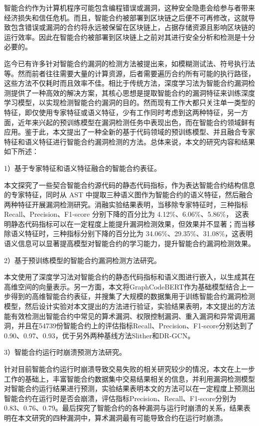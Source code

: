 \cleardoublepage
{}
智能合约作为计算机程序可能包含编程错误或漏洞，这种安全隐患会给参与者带来经济损失和信任危机。而且，智能合约被部署到区块链之后便不可再修改，这就导致包含错误或漏洞的合约将永远被保留在区块链上，占据存储资源且影响区块链的运行效率。因此在智能合约被部署到区块链上之前对其进行安全分析和检测是十分必要的。

迄今已有许多针对智能合约漏洞的检测方法被提出来，如模糊测试法、符号执行法等。然而前者往往需要大量的计算资源，后者需要遍历合约所有可能的执行路径，这些方法不仅耗时而且效率不佳。相比于传统方法，深度学习法为智能合约漏洞检测提供了一种高效的解决方案，其核心思想是提取智能合约的漏洞特征来训练深度学习模型，以实现检测智能合约漏洞的目的。然而现有工作大都只关注单一类型的特征，即仅使用专家特征或语义特征，少有工作同时考虑到这两种特征，另一方面，近年来兴起的预训练模型在漏洞检测任务中表现出色，而在智能合约领域鲜有应用。鉴于此，本文提出了一种全新的基于代码领域的预训练模型、并且融合专家特征和语义特征进行智能合约漏洞检测的方法。总体来说，本文的研究内容和结果如下所述：

    1）基于专家特征和语义特征融合的智能合约表征。

    本文探究了一些契合智能合约源代码的静态代码指标，作为表达智能合约结构信息的专家特征，同时从 AST 中提取三种语义图作为智能合约的语义特征，然后融合两种特征开展漏洞检测研究。消融实验结果表明，当移除专家特征时，三种指标 Recall、Precision、F1-score 分别下降的百分比为 4.12\%、6.06\%、5.86\%， 这表明静态代码指标可以在一定程度上能提升漏洞检测效果，但效果并不显著；而当移除语义特征时，三种指标分别下降的百分比为 34.06\%、29.35\%、31.08\%，这表明语义信息可以显著提高模型对智能合约的学习能力，提升智能合约漏洞检测效果。

    2）基于预训练模型的智能合约漏洞检测方法研究。
    
    本文使用了深度学习法对智能合约的静态代码指标和语义图进行嵌入，以生成其在高维空间的向量表示。另一方面，本文将GraphCodeBERT作为基础模型结合上一步得到的高维智能合约表征，并搜集了大规模的数据集用于训练智能合约漏洞检测模型，然后设计实验对本文提出的方法进行验证，实验结果表明，本文提出的方法能有效检测出智能合约中常见的算术漏洞、权限控制漏洞、重入漏洞和异常调用漏洞，并且在\num{54739}份智能合约上的评估指标Recall、Precision、F1-score分别达到了0.90、0.97、0.93，优于另外两种基线方法Slither和DR-GCN。
    
    3）智能合约运行时崩溃预测方法研究。
    
    针对目前智能合约运行时崩溃导致交易失败的相关研究较少的情况，本文在上一步工作的基础上，丰富智能合约数据集中交易结果相关的信息，并利用漏洞检测模型对智能合约运行结果进行预测，实验结果表明本文的方法可以在一定程度上预测出智能合约在运行时是否会崩溃，评估指标Precision、Recall、F1-score分别为0.83、0.76、0.79。最后探究了智能合约的各种漏洞与运行时崩溃的关系，结果表明在本文研究的四种漏洞中，算术漏洞最有可能导致合约在运行时崩溃。



